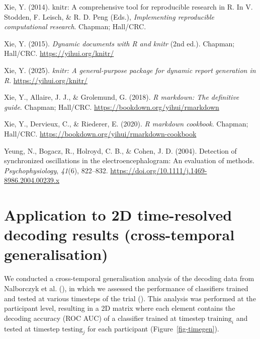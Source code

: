 \documentclass[
  doc,
  floatsintext,
  longtable,
  a4paper,
  nolmodern,
  notxfonts,
  notimes,
  colorlinks=true,linkcolor=blue,citecolor=blue,urlcolor=blue]{apa7}
\newlength{\cslhangindent}
\newenvironment{CSLReferences}[2] %
 {\begin{list}{}{%
  \setlength{\itemindent}{0pt}
  \setlength{\leftmargin}{0pt}
  \setlength{\parsep}{0pt}
  \ifodd #1
   \setlength{\leftmargin}{\cslhangindent}
   \setlength{\itemindent}{-1\cslhangindent}
  \fi
  \setlength{\itemsep}{#2\baselineskip}}}
 {\end{list}}
\begin{document}
\begin{CSLReferences}{1}{0}
Xie, Y. (2014). {knitr}: A comprehensive tool for reproducible research
in {R}. In V. Stodden, F. Leisch, \& R. D. Peng (Eds.),
\emph{Implementing reproducible computational research}. Chapman;
Hall/CRC.

Xie, Y. (2015). \emph{Dynamic documents with {R} and knitr} (2nd ed.).
Chapman; Hall/CRC. \url{https://yihui.org/knitr/}

Xie, Y. (2025). \emph{{knitr}: A general-purpose package for dynamic
report generation in {R}}. \url{https://yihui.org/knitr/}

Xie, Y., Allaire, J. J., \& Grolemund, G. (2018). \emph{R markdown: The
definitive guide}. Chapman; Hall/CRC.
\url{https://bookdown.org/yihui/rmarkdown}

Xie, Y., Dervieux, C., \& Riederer, E. (2020). \emph{R markdown
cookbook}. Chapman; Hall/CRC.
\url{https://bookdown.org/yihui/rmarkdown-cookbook}

Yeung, N., Bogacz, R., Holroyd, C. B., \& Cohen, J. D. (2004). Detection
of synchronized oscillations in the electroencephalogram: An evaluation
of methods. \emph{Psychophysiology}, \emph{41}(6), 822--832.
\url{https://doi.org/10.1111/j.1469-8986.2004.00239.x}

\end{CSLReferences}

\newpage

\appendix

\section{Application to 2D time-resolved decoding results
(cross-temporal generalisation)}\label{apx-2D}

\setlength{\parindent}{0pt}
\setlength{\parskip}{6pt}

We conducted a cross-temporal generalisation analysis of the decoding
data from Nalborczyk et al. (), in which we assessed the performance of classifiers
trained and tested at various timesteps of the trial
(). This analysis was
performed at the participant level, resulting in a 2D matrix where each
element contains the decoding accuracy (ROC AUC) of a classifier trained
at timestep \(\text{training}_{i}\) and tested at timestep
\(\text{testing}_{j}\) for each participant (Figure~\ref{fig-timegen}).
\end{document}
